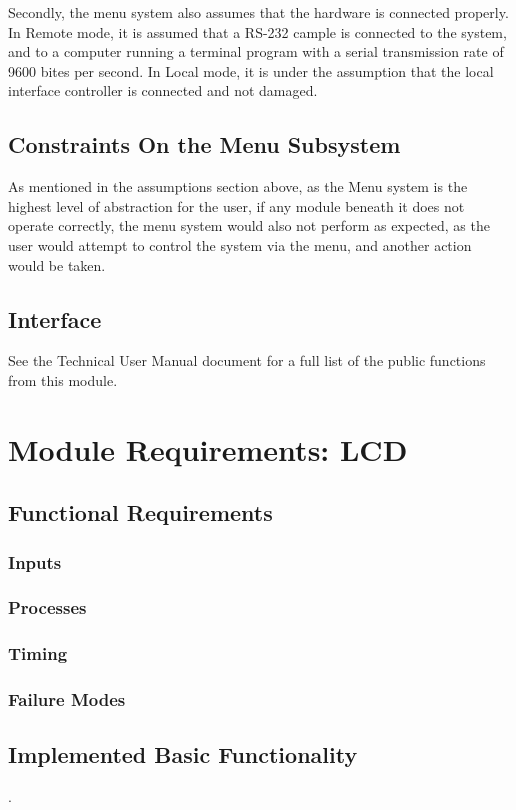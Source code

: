 \documentclass[]{report}
\begin{document}
Secondly, the menu system also assumes that the hardware is connected properly. In Remote mode, it is assumed that a RS-232 cample is connected to the system, and to a computer running a terminal program with a serial transmission rate of 9600 bites per second. In Local mode, it is under the assumption that the local interface controller is connected and not damaged. 

\subsection{Constraints On the Menu Subsystem}
As mentioned in the assumptions section above, as the Menu system is the highest level of abstraction for the user, if any module beneath it does not operate correctly, the menu system would also not perform as expected, as the user would attempt to control the system via the menu, and another action would be taken.

\subsection{Interface}
See the Technical User Manual document for a full list of the public functions from this module.

\section{Module Requirements: LCD}
\subsection{Functional Requirements}
\subsubsection{Inputs}

\subsubsection{Processes}

\subsubsection{Timing}

\subsubsection{Failure Modes}

\subsection{Implemented Basic Functionality}.
\end{document}
